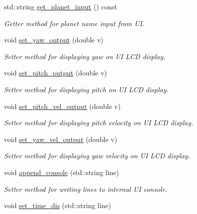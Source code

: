 \begin{DoxyCompactItemize}
std\+::string \mbox{\hyperlink{classTelescopeUI_a821001a5b68adc425ca4b5abf40c1d20}{get\+\_\+planet\+\_\+input}} () const
\begin{DoxyCompactList}\small\item\em Getter method for planet name input from UI. \end{DoxyCompactList}\item 
void \mbox{\hyperlink{classTelescopeUI_ac228bd23c7e759df5aa81206872214b5}{set\+\_\+yaw\+\_\+output}} (double v)
\begin{DoxyCompactList}\small\item\em Setter method for displaying yaw on UI \textquotesingle{}L\+CD display\textquotesingle{}. \end{DoxyCompactList}\item 
void \mbox{\hyperlink{classTelescopeUI_a4388ce748e1ad31dbb5d9d4df38c750b}{set\+\_\+pitch\+\_\+output}} (double v)
\begin{DoxyCompactList}\small\item\em Setter method for displaying pitch on UI \textquotesingle{}L\+CD display\textquotesingle{}. \end{DoxyCompactList}\item 
void \mbox{\hyperlink{classTelescopeUI_a3d767f297da01b6cb685578ed2479e25}{set\+\_\+pitch\+\_\+vel\+\_\+output}} (double v)
\begin{DoxyCompactList}\small\item\em Setter method for displaying pitch velocity on UI \textquotesingle{}L\+CD display\textquotesingle{}. \end{DoxyCompactList}\item 
void \mbox{\hyperlink{classTelescopeUI_aa606620872e1d9402b74c26664d12c3d}{set\+\_\+yaw\+\_\+vel\+\_\+output}} (double v)
\begin{DoxyCompactList}\small\item\em Setter method for displaying yaw velocity on UI \textquotesingle{}L\+CD display\textquotesingle{}. \end{DoxyCompactList}\item 
void \mbox{\hyperlink{classTelescopeUI_a3761db8f2002e52be63df7cab0bf6167}{append\+\_\+console}} (std\+::string line)
\begin{DoxyCompactList}\small\item\em Setter method for writing lines to internal UI console. \end{DoxyCompactList}\item 
void \mbox{\hyperlink{classTelescopeUI_aa4bddc57881d00dd145312c84467ac1d}{set\+\_\+time\+\_\+dis}} (std\+::string line)

\end{DoxyCompactItemize}
